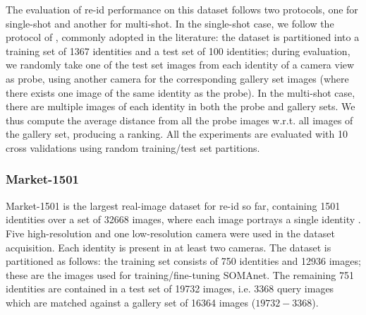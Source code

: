 \documentclass[10pt,journal,letterpaper,compsoc]{IEEEtran}
\begin{document}
The evaluation of re-id performance on this dataset follows two protocols, one for single-shot and another for multi-shot. In the single-shot case, we follow the protocol of  \cite{li2014deepreid}, commonly adopted in the literature: the dataset is partitioned into a training set of 1367 identities and a test set of 100 identities; during evaluation, we randomly take one of the test set images from each identity of a camera view as probe, using another camera for the corresponding gallery set images (where there exists one image of the same identity as the probe). In the multi-shot case, there are multiple images of each identity in both the probe and gallery sets. We thus compute the average distance from all the probe images w.r.t. all images of the gallery set, producing a ranking.  All the experiments are evaluated with 10 cross validations using random training/test set partitions.


\subsubsection{Market-1501}

Market-1501 is the largest real-image dataset for re-id so far, containing 1501 identities over a set of 32668 images, where each image portrays a single identity \cite{market}.
Five high-resolution and one low-resolution camera were used in the dataset acquisition. Each identity is present in at least two cameras. The dataset is partitioned as follows: the training set consists of 750 identities and 12936 images; these are the images used for training/fine-tuning SOMAnet. The remaining 751 identities are contained in a test set of 19732 images, i.e. 3368 query images which are matched against a gallery set of 16364 images ($19732-3368$).



\end{document}
